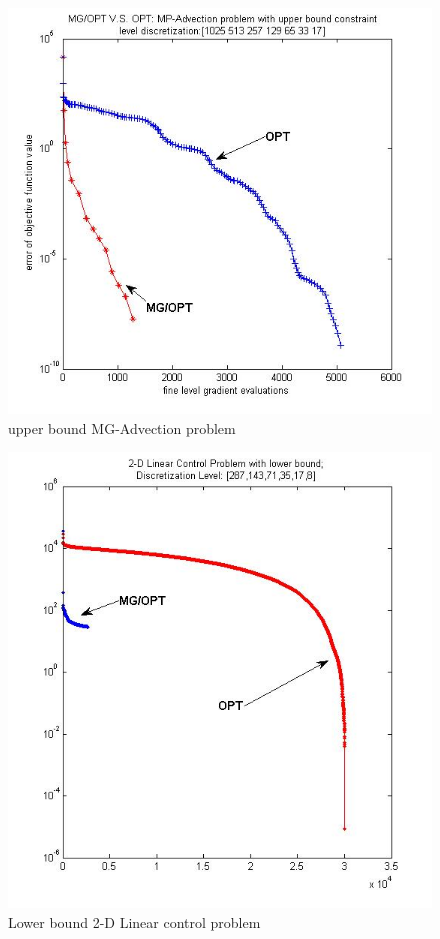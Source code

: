 \documentclass[10pt]{article}
\begin{document}
\begin{itemize}
\begin{figure}[h]
\centering
  \includegraphics[width=1.0\textwidth]{plot1s1025.jpg}
  \caption{upper bound MG-Advection problem}
\label{fig:advection}
\end{figure}

\begin{figure}[h]
\centering
  \includegraphics[width=1.0\textwidth]{plot1s287n.jpg}
  \caption{Lower bound  2-D Linear control problem}
\label{fig:bicontrol}
\end{figure}


\end{itemize}
\end{document}
